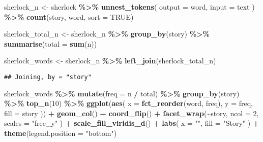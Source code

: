 \documentclass[
]{book}
\newenvironment{Shaded}{\begin{snugshade}}{\end{snugshade}}
\newcommand{\DataTypeTok}[1]{\textcolor[rgb]{0.13,0.29,0.53}{#1}}
\newcommand{\DecValTok}[1]{\textcolor[rgb]{0.00,0.00,0.81}{#1}}
\newcommand{\KeywordTok}[1]{\textcolor[rgb]{0.13,0.29,0.53}{\textbf{#1}}}
\newcommand{\NormalTok}[1]{#1}
\newcommand{\OperatorTok}[1]{\textcolor[rgb]{0.81,0.36,0.00}{\textbf{#1}}}
\newcommand{\OtherTok}[1]{\textcolor[rgb]{0.56,0.35,0.01}{#1}}
\newcommand{\StringTok}[1]{\textcolor[rgb]{0.31,0.60,0.02}{#1}}
\begin{document}
\begin{Shaded}
\begin{Highlighting}[]
\NormalTok{sherlock\_n \textless{}{-}}\StringTok{ }\NormalTok{sherlock }\OperatorTok{\%\textgreater{}\%}
\StringTok{  }\KeywordTok{unnest\_tokens}\NormalTok{(}
    \DataTypeTok{output =}\NormalTok{ word,}
    \DataTypeTok{input =}\NormalTok{ text}
\NormalTok{  ) }\OperatorTok{\%\textgreater{}\%}
\StringTok{  }\KeywordTok{count}\NormalTok{(story, word, }\DataTypeTok{sort =} \OtherTok{TRUE}\NormalTok{)}

\NormalTok{sherlock\_total\_n \textless{}{-}}\StringTok{ }\NormalTok{sherlock\_n }\OperatorTok{\%\textgreater{}\%}
\StringTok{  }\KeywordTok{group\_by}\NormalTok{(story) }\OperatorTok{\%\textgreater{}\%}
\StringTok{  }\KeywordTok{summarise}\NormalTok{(}\DataTypeTok{total =} \KeywordTok{sum}\NormalTok{(n))}

\NormalTok{sherlock\_words \textless{}{-}}\StringTok{ }\NormalTok{sherlock\_n }\OperatorTok{\%\textgreater{}\%}
\StringTok{  }\KeywordTok{left\_join}\NormalTok{(sherlock\_total\_n)}
\end{Highlighting}
\end{Shaded}

\begin{verbatim}
## Joining, by = "story"
\end{verbatim}

\begin{Shaded}
\begin{Highlighting}[]
\NormalTok{sherlock\_words }\OperatorTok{\%\textgreater{}\%}
\StringTok{  }\KeywordTok{mutate}\NormalTok{(}\DataTypeTok{freq =}\NormalTok{ n }\OperatorTok{/}\StringTok{ }\NormalTok{total) }\OperatorTok{\%\textgreater{}\%}
\StringTok{  }\KeywordTok{group\_by}\NormalTok{(story) }\OperatorTok{\%\textgreater{}\%}
\StringTok{  }\KeywordTok{top\_n}\NormalTok{(}\DecValTok{10}\NormalTok{) }\OperatorTok{\%\textgreater{}\%}
\StringTok{  }\KeywordTok{ggplot}\NormalTok{(}\KeywordTok{aes}\NormalTok{(}
    \DataTypeTok{x =} \KeywordTok{fct\_reorder}\NormalTok{(word, freq),}
    \DataTypeTok{y =}\NormalTok{ freq,}
    \DataTypeTok{fill =}\NormalTok{ story}
\NormalTok{  )) }\OperatorTok{+}
\StringTok{  }\KeywordTok{geom\_col}\NormalTok{() }\OperatorTok{+}
\StringTok{  }\KeywordTok{coord\_flip}\NormalTok{() }\OperatorTok{+}
\StringTok{  }\KeywordTok{facet\_wrap}\NormalTok{(}\OperatorTok{\textasciitilde{}}\NormalTok{story,}
    \DataTypeTok{ncol =} \DecValTok{2}\NormalTok{,}
    \DataTypeTok{scales =} \StringTok{"free\_y"}
\NormalTok{  ) }\OperatorTok{+}
\StringTok{  }\KeywordTok{scale\_fill\_viridis\_d}\NormalTok{() }\OperatorTok{+}
\StringTok{  }\KeywordTok{labs}\NormalTok{(}
    \DataTypeTok{x =} \StringTok{""}\NormalTok{,}
    \DataTypeTok{fill =} \StringTok{"Story"}
\NormalTok{  ) }\OperatorTok{+}
\StringTok{  }\KeywordTok{theme}\NormalTok{(}\DataTypeTok{legend.position =} \StringTok{"bottom"}\NormalTok{)}
\end{Highlighting}
\end{Shaded}
\end{document}
